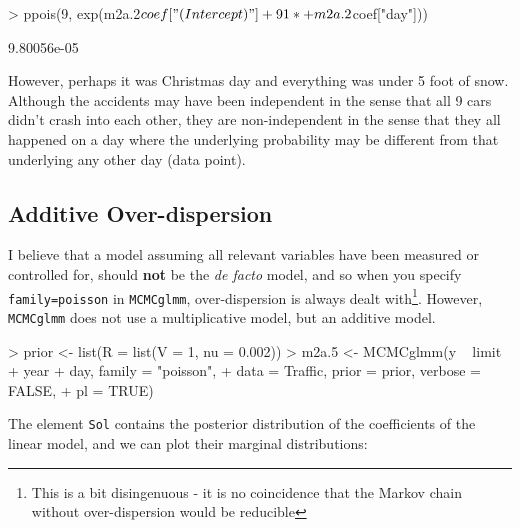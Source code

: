 \documentclass{article}
\begin{document}
\begin{Schunk}
\begin{Sinput}
> ppois(9, exp(m2a.2$coef["(Intercept)"] + 91 * 
+     m2a.2$coef["day"]))
\end{Sinput}
\begin{Soutput}
[1] 9.80056e-05
\end{Soutput}
\end{Schunk}

However, perhaps it was Christmas day and everything was under 5 foot of snow. Although the accidents may have been independent in the sense that all 9 cars didn't crash into each other, they are non-independent in the sense that they all happened on a day where the underlying probability may be different from that underlying any other day (data point).  

\subsection{Additive Over-dispersion}
\label{addod-sec}

I believe that a model assuming all relevant variables have been measured or controlled for, should {\bf not} be the \emph{de facto} model, and so when you specify \texttt{family=poisson} in \texttt{MCMCglmm}, over-dispersion is always dealt with\footnote{This is a bit disingenuous - it is no coincidence that the Markov chain without over-dispersion would be reducible}. However, \texttt{MCMCglmm} does not use a multiplicative model, but an additive model. 

\begin{Schunk}
\begin{Sinput}
> prior <- list(R = list(V = 1, nu = 0.002))
> m2a.5 <- MCMCglmm(y ~ limit + year + day, family = "poisson", 
+     data = Traffic, prior = prior, verbose = FALSE, 
+     pl = TRUE)
\end{Sinput}
\end{Schunk}

The element \texttt{Sol} contains the posterior distribution of the coefficients of the linear model, and we can plot their marginal distributions:
\end{document}
